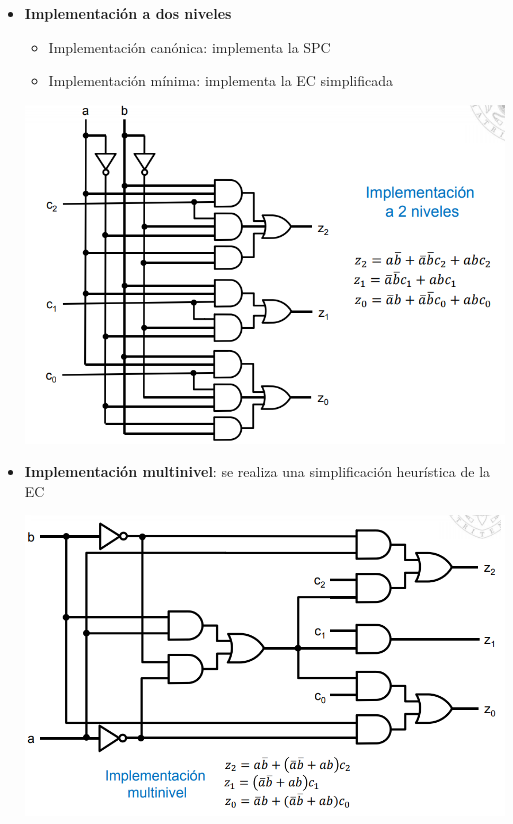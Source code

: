 \documentclass[a4paper,10pt]{book}
\begin{document}
\begin{itemize}
\item \textbf{Implementación a dos niveles}
\begin{itemize}
\item Implementación canónica: implementa la SPC
\item Implementación mínima: implementa la EC simplificada
\end{itemize}

\begin{center}
\includegraphics[scale=0.35]{imp multinivel}
\end{center}

\item \textbf{Implementación multinivel}: se realiza una simplificación heurística de la EC

\begin{center}
\includegraphics[scale=0.35]{imp dos niveles}
\end{center}
\end{itemize}
\end{document}
